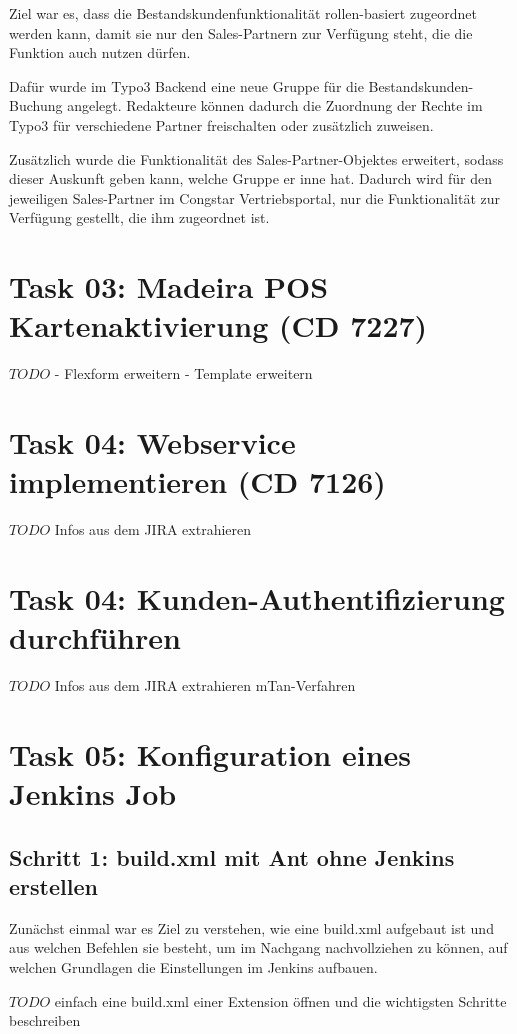 \documentclass[11pt,a4paper]{article} %
\begin{document}
Ziel war es, dass die Bestandskundenfunktionalität rollen-basiert zugeordnet werden kann, 
damit sie nur den Sales-Partnern zur Verfügung steht, die die Funktion auch nutzen dürfen.

Dafür wurde im Typo3 Backend eine neue Gruppe für die Bestandskunden-Buchung angelegt.
Redakteure können dadurch die Zuordnung der Rechte im Typo3 für verschiedene Partner freischalten
oder zusätzlich zuweisen.

Zusätzlich wurde die Funktionalität des Sales-Partner-Objektes erweitert, sodass dieser Auskunft geben kann, 
welche Gruppe er inne hat. Dadurch wird für den jeweiligen Sales-Partner im Congstar Vertriebsportal,
nur die Funktionalität zur Verfügung gestellt, die ihm zugeordnet ist.

\section{Task 03: Madeira POS Kartenaktivierung (CD 7227)}

$TODO$
- Flexform erweitern
- Template erweitern

\section{Task 04: Webservice implementieren (CD 7126)}

$TODO$
Infos aus dem JIRA extrahieren

\section{Task 04: Kunden-Authentifizierung durchführen}

$TODO$
Infos aus dem JIRA extrahieren
mTan-Verfahren

\section{Task 05: Konfiguration eines Jenkins Job}

\subsection{Schritt 1: build.xml mit Ant ohne Jenkins erstellen}
Zunächst einmal war es Ziel zu verstehen, wie eine build.xml aufgebaut ist
und aus welchen Befehlen sie besteht, um im Nachgang nachvollziehen zu können, auf welchen
Grundlagen die Einstellungen im Jenkins aufbauen.

$TODO$ einfach eine build.xml einer Extension öffnen und die wichtigsten Schritte beschreiben
\end{document}

